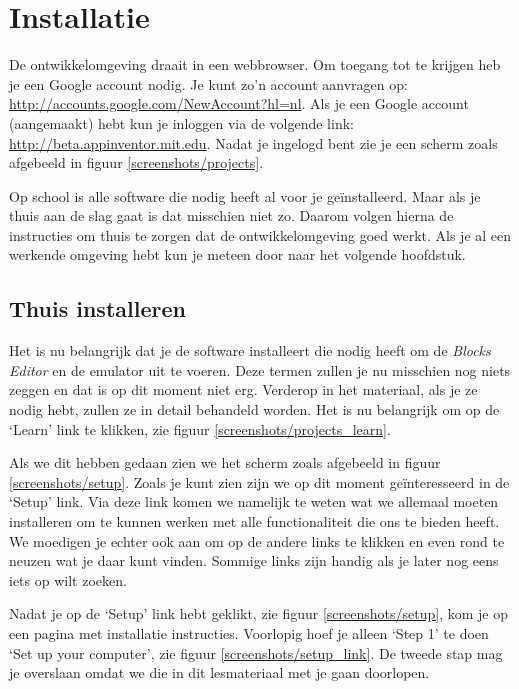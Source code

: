 \chapter{Installatie}

De \ai ontwikkelomgeving draait in een webbrowser. Om toegang tot \ai te krijgen heb je een Google account nodig. Je kunt zo'n account aanvragen op: \url{http://accounts.google.com/NewAccount?hl=nl}. Als je een Google account (aangemaakt) hebt kun je inloggen via de volgende link: \url{http://beta.appinventor.mit.edu}.
Nadat je ingelogd bent zie je een scherm zoals afgebeeld in figuur \ref{screenshots/projects}.

 
Op school is alle software die \ai nodig heeft al voor je ge\"installeerd. Maar als je thuis aan de slag gaat is dat misschien niet zo. Daarom volgen hierna de instructies om thuis te zorgen dat de \ai ontwikkelomgeving goed werkt. Als je al een werkende omgeving hebt kun je meteen door naar het volgende hoofdstuk. 

\section{Thuis installeren}
Het is nu belangrijk dat je de software installeert die \ai nodig heeft om de \emph{Blocks Editor} en de emulator uit te voeren. Deze termen zullen je nu misschien nog niets zeggen en dat is op dit moment niet erg. Verderop in het materiaal, als je ze nodig hebt, zullen ze in detail behandeld worden. Het is nu belangrijk om op de `Learn' link te klikken, zie figuur \ref{screenshots/projects_learn}.


Als we dit hebben gedaan zien we het scherm zoals afgebeeld in figuur \ref{screenshots/setup}. Zoals je kunt zien zijn we op dit moment ge\"interesseerd in de `Setup' link. Via deze link komen we namelijk te weten wat we allemaal moeten installeren om te kunnen werken met alle functionaliteit die \ai ons te bieden heeft.
We moedigen je echter ook aan om op de andere links te klikken en even rond te neuzen wat je daar kunt vinden. Sommige links zijn handig als je later nog eens iets op wilt zoeken.


Nadat je op de `Setup' link hebt geklikt, zie figuur \ref{screenshots/setup}, kom je op een pagina met installatie instructies. Voorlopig hoef je alleen `Step 1' te doen `Set up your computer', zie figuur \ref{screenshots/setup_link}.
De tweede stap mag je overslaan omdat we die in dit lesmateriaal met je gaan doorlopen.

